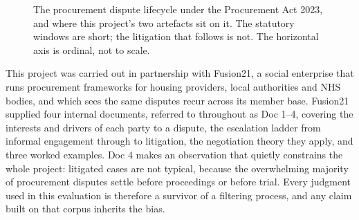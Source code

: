 \begin{figure}[htbp]
\centering
{}
\caption[The procurement dispute lifecycle]{The procurement dispute lifecycle
under the Procurement Act 2023, and where this project's two artefacts sit on it.
The statutory windows are short; the litigation that follows is not. The horizontal
axis is ordinal, not to scale.}
\label{fig:lifecycle}
\end{figure}

This project was carried out in partnership with Fusion21, a social enterprise
that runs procurement frameworks for housing providers, local authorities and
NHS bodies, and which sees the same disputes recur across its member base.
Fusion21 supplied four internal documents, referred to throughout as Doc 1--4,
covering the interests and drivers of each party to a dispute, the escalation
ladder from informal engagement through to litigation, the negotiation theory
they apply, and three worked examples. Doc 4 makes an observation that quietly
constrains the whole project: litigated cases are not typical, because the
overwhelming majority of procurement disputes settle before proceedings or
before trial. Every judgment used in this evaluation is therefore a survivor of a
filtering process, and any claim built on that corpus inherits the bias.

